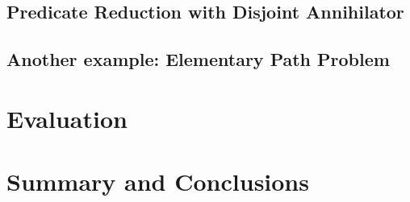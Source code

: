 \documentclass[a4paper,12pt,twoside,openright]{report}
\begin{document}
\section{Predicate Reduction with Disjoint Annihilator}

\section{Another example: Elementary Path Problem}


\chapter{Evaluation} 



\chapter{Summary and Conclusions} 

%




\appendix
\singlespacing

 

\end{document}
